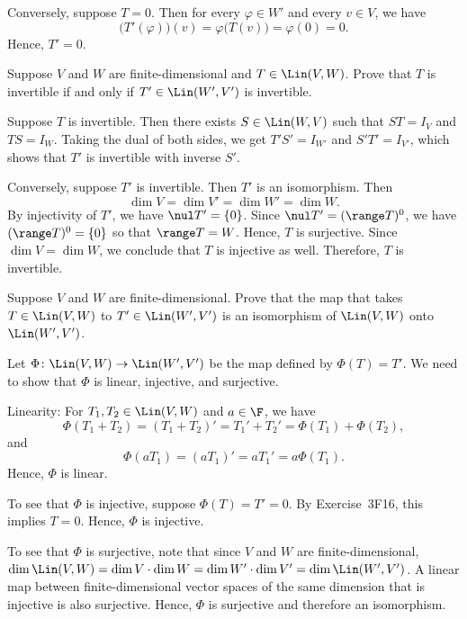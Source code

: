 \begin{exc}
\begin{solution}
Conversely, suppose $T=0$. Then for every $\varphi\in W'$ and every $v\in V$, we
have
\[ \bigl(T'(\varphi)\bigr)(v) = \varphi\bigl(T(v)\bigr) = \varphi(0) = 0. \]
Hence, $T'=0$.
\end{solution}

\begin{exercise}
Suppose $V$ and $W$ are finite-dimensional and $T\in\Lin(V,W)$. Prove that $T$
is invertible if and only if $T'\in\Lin(W',V')$ is invertible.
\end{exercise}
\begin{solution}
Suppose $T$ is invertible. Then there exists $S\in\Lin(W,V)$ such that
$ST=I_V$ and $TS=I_W$. Taking the dual of both sides, we get $T'S'=I_{W'}$ and
$S'T'=I_{V'}$, which shows that $T'$ is invertible with inverse $S'$.

Conversely, suppose $T'$ is invertible. Then $T'$ is an isomorphism. Then
\[ \dim V = \dim V' = \dim W' = \dim W. \]
By injectivity of $T'$, we have $\nul T'=\{0\}$. Since
$\nul T'=(\range T)^0$, we have $(\range T)^0=\{0\}$ so that $\range T=W$.
Hence, $T$ is surjective. Since $\dim V=\dim W$, we conclude that $T$ is
injective as well. Therefore, $T$ is invertible.
\end{solution}

\begin{exercise}
Suppose $V$ and $W$ are finite-dimensional. Prove that the map that takes
$T\in\Lin(V,W)$ to $T'\in\Lin(W',V')$ is an isomorphism of $\Lin(V,W)$ onto
$\Lin(W',V')$.
\end{exercise}
\begin{solution}
Let $\Phi\colon\Lin(V,W)\to\Lin(W',V')$ be the map defined by $\Phi(T)=T'$. We
need to show that $\Phi$ is linear, injective, and surjective.

Linearity: For $T_1,T_2\in\Lin(V,W)$ and $a\in\F$, we have
\[ \Phi(T_1+T_2) = (T_1+T_2)' = {T_1}'+{T_2}' = \Phi(T_1)+\Phi(T_2), \]
and
\[ \Phi(aT_1) = (aT_1)' = a{T_1}' = a\Phi(T_1). \]
Hence, $\Phi$ is linear.

To see that $\Phi$ is injective, suppose $\Phi(T)=T'=0$. By Exercise~3F16, this
implies $T=0$. Hence, $\Phi$ is injective.

To see that $\Phi$ is surjective, note that since $V$ and $W$ are
finite-dimensional,
$\dim\Lin(V,W)=\dim V\cdot\dim W=\dim W'\cdot\dim V'=\dim\Lin(W',V')$. A linear
map between finite-dimensional vector spaces of the same dimension that is
injective is also surjective. Hence, $\Phi$ is surjective and therefore an
isomorphism.
\end{solution}


\end{exc}
